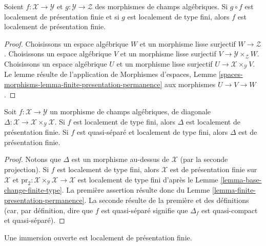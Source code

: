 \begin{lemma}
\label{lemma-finite-presentation-permanence}
Soient $f : \mathcal{X} \to \mathcal{Y}$ et
$g : \mathcal{Y} \to \mathcal{Z}$ des morphismes de champs algébriques.
Si $g \circ f$ est localement de présentation finie et si $g$ est localement
de type fini, alors $f$ est localement de présentation finie.
\end{lemma}

\begin{proof}
Choisissons un espace algébrique $W$ et un morphisme lisse surjectif
$W \to \mathcal{Z}$. Choisissons un espace algébrique $V$ et un morphisme
lisse surjectif $V \to \mathcal{Y} \times_\mathcal{Z} W$. Choisissons un
espace algébrique $U$ et un morphisme lisse surjectif
$U \to \mathcal{X} \times_\mathcal{Y} V$. Le lemme résulte de l'application
de Morphismes d'espaces, Lemme
\ref{spaces-morphisms-lemma-finite-presentation-permanence}
aux morphismes $U \to V \to W$.
\end{proof}

\begin{lemma}
\label{lemma-diagonal-morphism-finite-type}
Soit $f : \mathcal{X} \to \mathcal{Y}$ un morphisme de champs algébriques,
de diagonale
$\Delta : \mathcal{X} \to \mathcal{X} \times_\mathcal{Y} \mathcal{X}$.
Si $f$ est localement de type fini, alors $\Delta$ est localement de
présentation finie. Si $f$ est quasi-séparé et localement de type fini, alors
$\Delta$ est de présentation finie.
\end{lemma}

\begin{proof}
Notons que $\Delta$ est un morphisme au-dessus de $\mathcal{X}$ (par la
seconde projection). Si $f$ est localement de type fini, alors
$\mathcal{X}$ est de présentation finie sur $\mathcal{X}$ et
$\text{pr}_2 : \mathcal{X} \times_\mathcal{Y} \mathcal{X} \to \mathcal{X}$
est localement de type fini d'après le
Lemme \ref{lemma-base-change-finite-type}. La première assertion résulte donc
du Lemme \ref{lemma-finite-presentation-permanence}. La seconde résulte de la
première et des définitions (car, par définition, dire que $f$ est
quasi-séparé signifie que $\Delta_f$ est quasi-compact et quasi-séparé).
\end{proof}

\begin{lemma}
\label{lemma-open-immersion-locally-finite-presentation}
Une immersion ouverte est localement de présentation finie.
\end{lemma}

